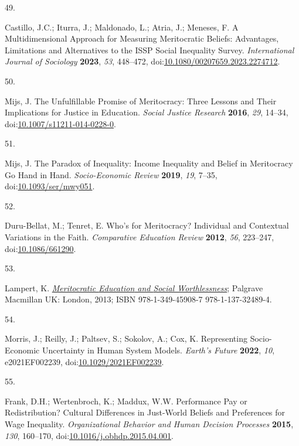 \documentclass[
  12pt,
  letterpaper,
]{article}
\newlength{\cslhangindent}
\newlength{\csllabelwidth}
\newenvironment{CSLReferences}[2] %
 {\begin{list}{}{%
  \setlength{\itemindent}{0pt}
  \setlength{\leftmargin}{0pt}
  \setlength{\parsep}{0pt}
  \ifodd #1
   \setlength{\leftmargin}{\cslhangindent}
   \setlength{\itemindent}{-1\cslhangindent}
  \fi
  \setlength{\itemsep}{#2\baselineskip}}}
 {\end{list}}
\newcommand{\CSLLeftMargin}[1]{\parbox[t]{\csllabelwidth}{\strut#1\strut}}
\newcommand{\CSLRightInline}[1]{\parbox[t]{\linewidth - \csllabelwidth}{\strut#1\strut}}
\begin{document}
\begin{CSLReferences}{0}{0}
\CSLLeftMargin{49. }%
\CSLRightInline{Castillo, J.C.; Iturra, J.; Maldonado, L.; Atria, J.;
Meneses, F. A {Multidimensional Approach} for {Measuring Meritocratic
Beliefs}: {Advantages}, {Limitations} and {Alternatives} to the {ISSP
Social Inequality Survey}. \emph{International Journal of Sociology}
\textbf{2023}, \emph{53}, 448--472,
doi:\href{https://doi.org/10.1080/00207659.2023.2274712}{10.1080/00207659.2023.2274712}.}

\CSLLeftMargin{50. }%
\CSLRightInline{Mijs, J. The {Unfulfillable Promise} of {Meritocracy}:
{Three Lessons} and {Their Implications} for {Justice} in {Education}.
\emph{Social Justice Research} \textbf{2016}, \emph{29}, 14--34,
doi:\href{https://doi.org/10.1007/s11211-014-0228-0}{10.1007/s11211-014-0228-0}.}

\CSLLeftMargin{51. }%
\CSLRightInline{Mijs, J. The Paradox of Inequality: Income Inequality
and Belief in Meritocracy Go Hand in Hand. \emph{Socio-Economic Review}
\textbf{2019}, \emph{19}, 7--35,
doi:\href{https://doi.org/10.1093/ser/mwy051}{10.1093/ser/mwy051}.}

\CSLLeftMargin{52. }%
\CSLRightInline{Duru-Bellat, M.; Tenret, E. Who's for {Meritocracy}?
{Individual} and {Contextual Variations} in the {Faith}.
\emph{Comparative Education Review} \textbf{2012}, \emph{56}, 223--247,
doi:\href{https://doi.org/10.1086/661290}{10.1086/661290}.}

\CSLLeftMargin{53. }%
\CSLRightInline{Lampert, K.
\emph{\href{https://doi.org/10.1057/9781137324894}{Meritocratic
{Education} and {Social Worthlessness}}}; Palgrave Macmillan UK: London,
2013; ISBN 978-1-349-45908-7 978-1-137-32489-4.}

\CSLLeftMargin{54. }%
\CSLRightInline{Morris, J.; Reilly, J.; Paltsev, S.; Sokolov, A.; Cox,
K. Representing {Socio}-{Economic Uncertainty} in {Human System Models}.
\emph{Earth's Future} \textbf{2022}, \emph{10}, e2021EF002239,
doi:\href{https://doi.org/10.1029/2021EF002239}{10.1029/2021EF002239}.}

\CSLLeftMargin{55. }%
\CSLRightInline{Frank, D.H.; Wertenbroch, K.; Maddux, W.W. Performance
Pay or Redistribution? {Cultural} Differences in Just-World Beliefs and
Preferences for Wage Inequality. \emph{Organizational Behavior and Human
Decision Processes} \textbf{2015}, \emph{130}, 160--170,
doi:\href{https://doi.org/10.1016/j.obhdp.2015.04.001}{10.1016/j.obhdp.2015.04.001}.}


\end{CSLReferences}
\end{document}
